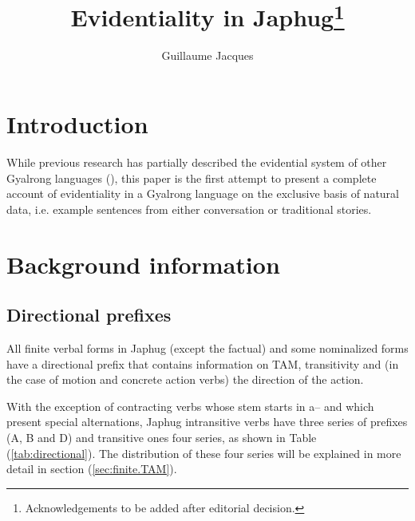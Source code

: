 \documentclass[oldfontcommands,oneside,a4paper,11pt]{article}
\newcommand{\ipa}[1]{{\phon \mbox{#1}}} %
\newcommand{\refb}[1]{(\ref{#1})}
\begin{document}
 
\title{Evidentiality in Japhug\footnote{ Acknowledgements to be added after editorial decision.
} }
\author{Guillaume Jacques}
\maketitle
\linenumbers

\section{Introduction}

While previous research has partially described the evidential system of other Gyalrong languages (\citealt{linyj03tense}), this paper is the first attempt to present a complete account of evidentiality in a Gyalrong language on the exclusive basis of natural data, i.e. example sentences from either conversation or traditional stories.

\section{Background information}
\subsection{Directional prefixes} \label{sec:directional}
All finite verbal forms in Japhug (except the factual) and some nominalized forms have a directional prefix that contains information on TAM, transitivity and  (in the case of motion and concrete action verbs) the direction of the action.

With the exception of contracting verbs whose stem starts in \ipa{a--} and which present special alternations, Japhug intransitive verbs have three series of prefixes (A, B and D) and transitive ones four series, as shown in Table \refb{tab:directional}. The distribution of these four series will be explained in more detail in section \refb{sec:finite.TAM}.
\end{document}
